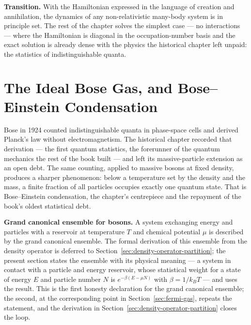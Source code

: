 \medskip\noindent\textbf{Transition.}
With the Hamiltonian expressed in the language of creation and annihilation, the dynamics of any non-relativistic many-body system is in principle set. The rest of the chapter solves the simplest case --- no interactions --- where the Hamiltonian is diagonal in the occupation-number basis and the exact solution is already dense with the physics the historical chapter left unpaid: the statistics of indistinguishable quanta.

\section{The Ideal Bose Gas, and Bose--Einstein Condensation}
\label{sec:bose-gas}

Bose in 1924 counted indistinguishable quanta in phase-space cells and derived Planck's law without electromagnetism. The historical chapter recorded that derivation --- the first quantum statistics, the forerunner of the quantum mechanics the rest of the book built --- and left its massive-particle extension as an open debt. The same counting, applied to massive bosons at fixed density, produces a sharper phenomenon: below a temperature set by the density and the mass, a finite fraction of all particles occupies exactly one quantum state. That is Bose--Einstein condensation, the chapter's centrepiece and the repayment of the book's oldest statistical debt.

\medskip\noindent\textbf{Grand canonical ensemble for bosons.}
A system exchanging energy and particles with a reservoir at temperature $T$ and chemical potential $\mu$ is described by the grand canonical ensemble. The formal derivation of this ensemble from the density operator is deferred to Section~\ref{sec:density-operator-partition}; the present section states the ensemble with its physical meaning --- a system in contact with a particle and energy reservoir, whose statistical weight for a state of energy $E$ and particle number $N$ is $e^{-\beta(E - \mu N)}$ with $\beta = 1/k_B T$ --- and uses the result. This is the first honesty declaration for the grand canonical ensemble; the second, at the corresponding point in Section~\ref{sec:fermi-gas}, repeats the statement, and the derivation in Section~\ref{sec:density-operator-partition} closes the loop.

